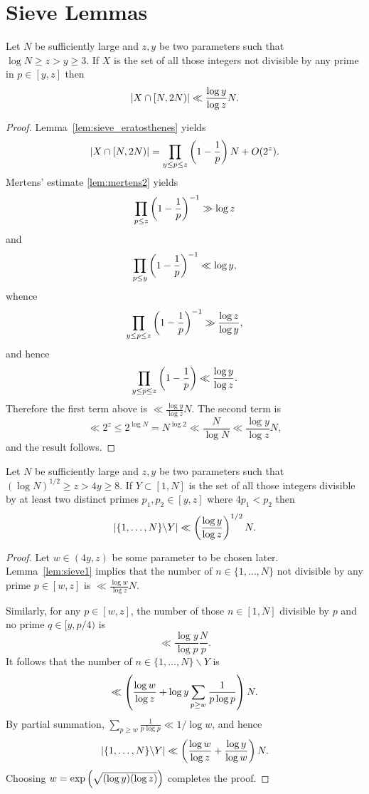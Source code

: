 \section{Sieve Lemmas}

\begin{lemma}\label{lem:sieve1}
\leanok
{}
Let $N$ be sufficiently large and $z,y$ be two parameters such that $\log N \geq z>y\geq 3$. If $X$ is the set of all those integers not divisible by any prime in $p\in [y,z]$ then
\[\left\lvert  X\cap [N,2N)\right\rvert\ll \frac{\log y}{\log z}N.\]
\end{lemma}
\begin{proof}
  \leanok
  Lemma~\ref{lem:sieve_eratosthenes} yields
  \[\left\lvert X\cap [N,2N)\right\rvert = \prod_{y\leq p\leq z}\left( 1-\frac{1}{p}\right)N+ O(2^z).\]
  Mertens' estimate \ref{lem:mertens2} yields
  \[\prod_{p\leq z}\left( 1-\frac{1}{p}\right)^{-1} \gg \log z\]
  and
  \[\prod_{p\leq y}\left( 1-\frac{1}{p}\right)^{-1} \ll \log y,\]
  whence
  \[\prod_{y\leq p\leq z}\left( 1-\frac{1}{p}\right)^{-1}\gg \frac{\log z}{\log y},\]
  and hence
  \[ \prod_{y\leq p\leq z}\left( 1-\frac{1}{p}\right)\ll \frac{\log y}{\log z}.\]
  Therefore the first term above is $\ll \frac{\log y}{\log z}N$. The second term is
  \[\ll 2^z \leq 2^{\log N}=N^{\log 2}\ll \frac{N}{\log N}\ll \frac{\log y}{\log z}N,\]
  and the result follows.
\end{proof}


\begin{lemma}\label{lem:sieve2}
  \leanok
Let $N$ be sufficiently large and $z,y$ be two parameters such that $(\log N)^{1/2}\geq z>4y\geq 8$. If $Y\subset [1,N]$ is the set of all those integers divisible by at least two distinct primes $p_1,p_2\in [y,z]$ where $4p_1<p_2$ then
\[\left\lvert  \{1,\ldots,N\}\backslash Y\right\rvert\ll \left( \frac{\log y}{\log z}\right)^{1/2}N.\]
\end{lemma}
\begin{proof}
  \leanok
  Let $w\in (4y,z)$ be some parameter to be chosen later. Lemma~\ref{lem:sieve1} implies that the number of $n\in \{1,\ldots,N\}$ not divisible by any prime $p\in [w,z]$ is $\ll \frac{\log w}{\log z}N$.

  Similarly, for any $p\in [w,z]$, the number of those $n\in [1,N]$ divisible by $p$ and no prime  $q\in [y,p/4)$ is
  \[\ll \frac{\log y}{\log p}\frac{N}{p}.\]
  It follows that the number of $n\in\{1,\ldots,N\}\backslash Y$ is
  \[\ll \left( \frac{\log w}{\log z}+ \log y\sum_{p\geq w}\frac{1}{p\log p}\right)N.\]
  By partial summation, $\sum_{p\geq w}\frac{1}{p\log p}\ll 1/\log w$, and hence
  \[\left\lvert  \{1,\ldots,N\}\backslash Y\right\rvert\ll \left( \frac{\log w}{\log z}+\frac{ \log y}{\log w}\right)N.\]
  Choosing $w=\exp\left( \sqrt{(\log y)(\log z)}\right)$ completes the proof.
\end{proof}


